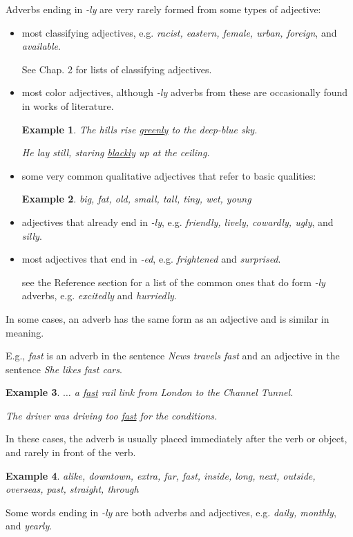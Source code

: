 \documentclass[oneside]{book}
\numberwithin{equation}{section}
\newtheorem{example}{Example}[section]
\begin{document}
%
\noindent{} Adverbs ending in \textit{-ly} are very rarely formed from some types of adjective:
\begin{itemize}
    \item most classifying adjectives, e.g. \textit{racist, eastern, female, urban, foreign}, and \textit{available}.
    
    See Chap. 2 for lists of classifying adjectives.
    \item most color adjectives, although \textit{-ly} adverbs from these are occasionally found in works of literature.
    \begin{example}
        The hills rise \underline{greenly} to the deep-blue sky.
        
        He lay still, staring \underline{blackly} up at the ceiling.
    \end{example}
    \item some very common qualitative adjectives that refer to basic qualities:
    \begin{example}
        big, fat, old, small, tall, tiny, wet, young
    \end{example}
    \item adjectives that already end in \textit{-ly}, e.g. \textit{friendly, lively, cowardly, ugly}, and \textit{silly}.
    \item most adjectives that end in \textit{-ed}, e.g. \textit{frightened} and \textit{surprised}.
    
    see the Reference section for a list of the common ones that do form \textit{-ly} adverbs, e.g. \textit{excitedly} and \textit{hurriedly}.
\end{itemize}
%
\noindent{} In some cases, an adverb has the same form as an adjective and is similar in meaning.

E.g., \textit{fast} is an adverb in the sentence \textit{News travels fast} and an adjective in the sentence \textit{She likes fast cars}.
\begin{example}
    $\ldots$ a \underline{fast} rail link from London to the Channel Tunnel.
    
    The driver was driving too \underline{fast} for the conditions.
\end{example}
In these cases, the adverb is usually placed immediately after the verb or object, and rarely in front of the verb.
\begin{example}
    alike, downtown, extra, far, fast, inside, long, next, outside, overseas, past, straight, through
\end{example}
Some words ending in \textit{-ly} are both adverbs and adjectives, e.g. \textit{daily, monthly}, and \textit{yearly}.
\end{document}
